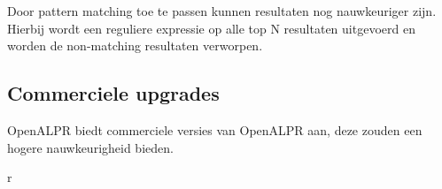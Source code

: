 Door pattern matching toe te passen kunnen resultaten nog nauwkeuriger zijn. Hierbij wordt een reguliere expressie op alle top N resultaten uitgevoerd en worden de non-matching resultaten verworpen.

\subsection{Commerciele upgrades}
OpenALPR biedt commerciele versies van OpenALPR aan, deze zouden een hogere nauwkeurigheid bieden.

r